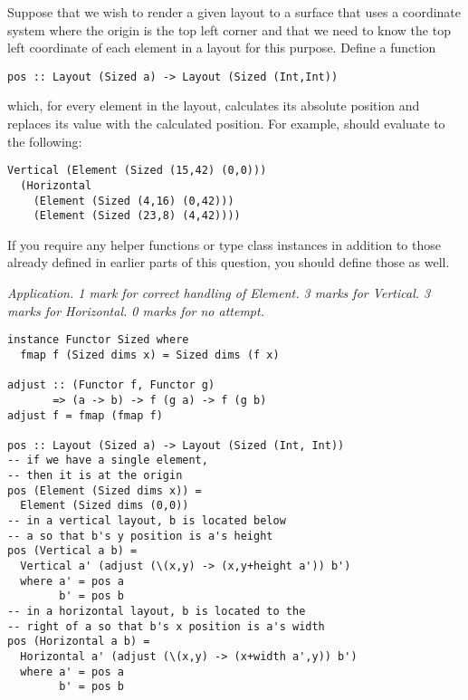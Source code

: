 \begin{parts}
\begin{subparts}
        \subpart[7] Suppose that we wish to render a given layout to a surface that uses a coordinate system where the origin is the top left corner and that we need to know the top left coordinate of each element in a layout for this purpose. Define a function 
        \vspace*{0.2cm}
        \begin{verbatim}
pos :: Layout (Sized a) -> Layout (Sized (Int,Int))
        \end{verbatim}
        \vspace*{0.2cm}
        which, for every element in the layout, calculates its absolute position and replaces its value with the calculated position. For example,  should evaluate to the following: \pagebreak
\begin{verbatim}
Vertical (Element (Sized (15,42) (0,0)))
  (Horizontal 
    (Element (Sized (4,16) (0,42))) 
    (Element (Sized (23,8) (4,42))))
\end{verbatim}
        If you require any helper functions or type class instances in addition to those already defined in earlier parts of this question, you should define those as well. \droppoints

        \begin{solution}
            \emph{Application. 1 mark for correct handling of Element. 3 marks for Vertical. 3 marks for Horizontal. 0 marks for no attempt.}
\begin{verbatim}
instance Functor Sized where
  fmap f (Sized dims x) = Sized dims (f x)

adjust :: (Functor f, Functor g)
       => (a -> b) -> f (g a) -> f (g b)
adjust f = fmap (fmap f)

pos :: Layout (Sized a) -> Layout (Sized (Int, Int))
-- if we have a single element, 
-- then it is at the origin
pos (Element (Sized dims x)) = 
  Element (Sized dims (0,0))
-- in a vertical layout, b is located below
-- a so that b's y position is a's height
pos (Vertical a b) = 
  Vertical a' (adjust (\(x,y) -> (x,y+height a')) b')
  where a' = pos a 
        b' = pos b
-- in a horizontal layout, b is located to the
-- right of a so that b's x position is a's width
pos (Horizontal a b) = 
  Horizontal a' (adjust (\(x,y) -> (x+width a',y)) b')
  where a' = pos a 
        b' = pos b
\end{verbatim}
        \end{solution}
    \end{subparts}
\end{parts}